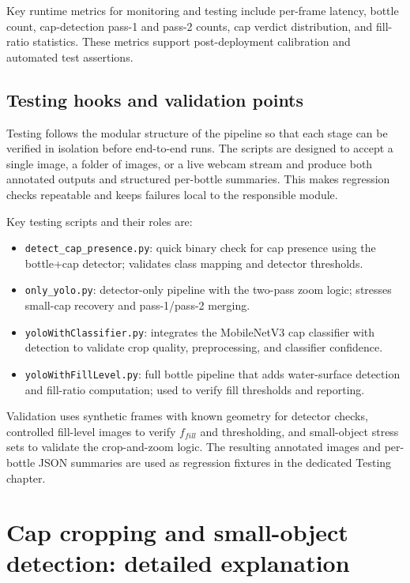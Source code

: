 \documentclass[12pt,a4paper]{report}
\begin{document}
Key runtime metrics for monitoring and testing include per-frame latency, bottle count, cap-detection pass-1 and pass-2 counts, cap verdict distribution, and fill-ratio statistics. These metrics support post-deployment calibration and automated test assertions.

\subsection{Testing hooks and validation points}
\label{subsec:testing-hooks}

Testing follows the modular structure of the pipeline so that each stage can be verified in isolation before end-to-end runs. The scripts are designed to accept a single image, a folder of images, or a live webcam stream and produce both annotated outputs and structured per-bottle summaries. This makes regression checks repeatable and keeps failures local to the responsible module.

Key testing scripts and their roles are:
\begin{itemize}
  \item \texttt{detect\_cap\_presence.py}: quick binary check for cap presence using the bottle+cap detector; validates class mapping and detector thresholds.
  \item \texttt{only\_yolo.py}: detector-only pipeline with the two-pass zoom logic; stresses small-cap recovery and pass-1/pass-2 merging.
  \item \texttt{yoloWithClassifier.py}: integrates the MobileNetV3 cap classifier with detection to validate crop quality, preprocessing, and classifier confidence.
  \item \texttt{yoloWithFillLevel.py}: full bottle pipeline that adds water-surface detection and fill-ratio computation; used to verify fill thresholds and reporting.
\end{itemize}

Validation uses synthetic frames with known geometry for detector checks, controlled fill-level images to verify $f_{fill}$ and thresholding, and small-object stress sets to validate the crop-and-zoom logic. The resulting annotated images and per-bottle JSON summaries are used as regression fixtures in the dedicated Testing chapter.

\section{Cap cropping and small-object detection: detailed explanation}
\label{sec:cap-cropping}
\end{document}
